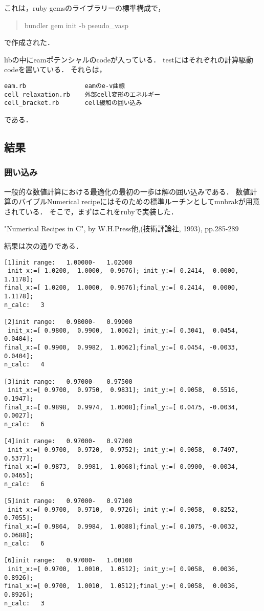 \documentclass[11pt,dvipdfmx]{jsarticle}
\begin{document}
これは，ruby gemsのライブラリーの標準構成で，

\begin{quote}
bundler gem init -b pseudo\_vasp
\end{quote}
で作成された．

libの中にeamポテンシャルのcodeが入っている．
testにはそれぞれの計算駆動codeを置いている． それらは，

\begin{verbatim}
eam.rb                eamのe-v曲線
cell_relaxation.rb    外部cell変形のエネルギー
cell_bracket.rb       cell緩和の囲い込み
\end{verbatim}

である．

    \subsection{結果}\label{ux7d50ux679c}

    \subsubsection{囲い込み}\label{ux56f2ux3044ux8fbcux307f}

一般的な数値計算における最適化の最初の一歩は解の囲い込みである．
数値計算のバイブルNumerical
recipeにはそのための標準ルーチンとしてmnbrakが用意されている．
そこで，まずはこれをrubyで実装した．

"Numerical Recipes in C", by W.H.Press他,(技術評論社, 1993), pp.285-289

結果は次の通りである．

\begin{verbatim}
[1]init range:   1.00000-   1.02000
 init_x:=[ 1.0200,  1.0000,  0.9676]; init_y:=[ 0.2414,  0.0000,  1.1178];
final_x:=[ 1.0200,  1.0000,  0.9676];final_y:=[ 0.2414,  0.0000,  1.1178];
n_calc:   3

[2]init range:   0.98000-   0.99000
 init_x:=[ 0.9800,  0.9900,  1.0062]; init_y:=[ 0.3041,  0.0454,  0.0404];
final_x:=[ 0.9900,  0.9982,  1.0062];final_y:=[ 0.0454, -0.0033,  0.0404];
n_calc:   4

[3]init range:   0.97000-   0.97500
 init_x:=[ 0.9700,  0.9750,  0.9831]; init_y:=[ 0.9058,  0.5516,  0.1947];
final_x:=[ 0.9898,  0.9974,  1.0008];final_y:=[ 0.0475, -0.0034,  0.0027];
n_calc:   6

[4]init range:   0.97000-   0.97200
 init_x:=[ 0.9700,  0.9720,  0.9752]; init_y:=[ 0.9058,  0.7497,  0.5377];
final_x:=[ 0.9873,  0.9981,  1.0068];final_y:=[ 0.0900, -0.0034,  0.0465];
n_calc:   6

[5]init range:   0.97000-   0.97100
 init_x:=[ 0.9700,  0.9710,  0.9726]; init_y:=[ 0.9058,  0.8252,  0.7055];
final_x:=[ 0.9864,  0.9984,  1.0088];final_y:=[ 0.1075, -0.0032,  0.0688];
n_calc:   6

[6]init range:   0.97000-   1.00100
 init_x:=[ 0.9700,  1.0010,  1.0512]; init_y:=[ 0.9058,  0.0036,  0.8926];
final_x:=[ 0.9700,  1.0010,  1.0512];final_y:=[ 0.9058,  0.0036,  0.8926];
n_calc:   3
\end{verbatim}
\end{document}
